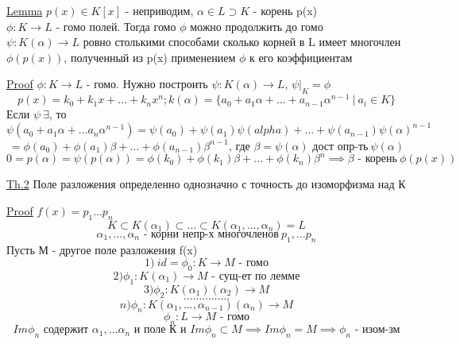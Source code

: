 \documentclass[a4paper]{article}
\begin{document}
\begin{tcolorbox}
    \underline{Lemma} $ p(x) \in K[x] $ - неприводим, $ \alpha \in L \supset K $ - 
    корень p(x)\\
    $ \phi: K \to L $ - гомо полей. Тогда гомо $ \phi $ можно продолжить до гомо\\
    $ \psi: K(\alpha) \to L $ ровно столькими способами сколько корней в L 
    имеет многочлен $ \phi(p(x)) $, полученный из p(x) применением $ \phi $ к его
    коэффициентам

    \underline{Proof} $ \phi: K \to L $ - гомо. Нужно построить $ \psi: K(\alpha) \to L $,
    $ \psi |_K = \phi $ 
    \[
        p(x) = k_0 + k_1x + \dots + k_n x^{n} ; k(\alpha) = \{ a_0 + a_1 \alpha +
        \dots + a_{n-1}\alpha^{n-1} \ | \ a_i \in K \}
    \]
    Если $ \psi \ \exists $, то
    \[
        \psi(a_0 + a_1\alpha + \dots a_n \alpha^{n-1}) = \psi(a_0) + \psi(a_1)
        \psi(alpha) + \dots + \psi(a_{n-1})\psi(\alpha)^{n-1} 
    \]
    \[
        = \phi(a_0) + \phi(a_1) \beta + \dots + \phi(a_{n-1})\beta^{n-1}
        \text{, где } \beta = \psi(\alpha) \text{ дост опр-ть}\ \psi(\alpha)
    \]
    \[
        0 = p(\alpha) = \psi(p(\alpha)) = \phi(k_0) + \phi(k_1) \beta + \dots +
        \phi(k_n)\beta^{n} \implies \beta \text{ - корень}\ \phi(p(x))
    \]
\end{tcolorbox}

\begin{tcolorbox}
\underline{Th.2} Поле разложения определенно однозначно с точность до изоморфизма над К

\underline{Proof} $ f(x) = p_1 \dots p_n $ 
\[
    K \subset K(\alpha_1) \subset \dots \subset K(\alpha_1, \dots, \alpha_n) = L
\]
\[
    \alpha_1, \dots, \alpha_n \text{ - корни непр-х многочленов}\ p_1, \dots p_n
\]
Пусть М - другое поле разложения f(x)
\[
    1) \ id = \phi_0: K \to M \text{ - гомо}
\]
\[
    2) \phi_1: K(\alpha_1) \to M \text{ - сущ-ет по лемме}
\]
\[
    3) \phi_2: K(\alpha_1)(\alpha_2) \to M
\]
\[
    \ldots\ldots\ldots\ldots\ldots
\]
\[
    n) \phi_n: K(\alpha_1, \dots, \alpha_{n-1})(\alpha_n) \to M
\]
\[
    \phi_n: L \to M \text{ - гомо}
\]
\[
    Im \phi_n \text{ содержит } \alpha_1, \dots \alpha_n \text{ и поле К и }
    Im \phi_n \subset M \implies Im \phi_n = M \implies \phi_n \text{ - изом-зм}
\]
\end{tcolorbox}
\end{document}
